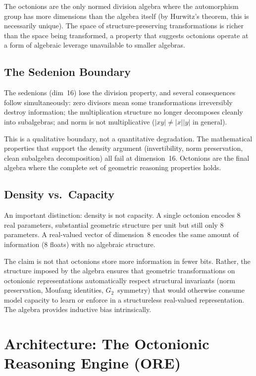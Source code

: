 \documentclass[11pt,a4paper]{article}
\begin{document}
The octonions are the only normed division algebra where the automorphism group has more dimensions than the algebra itself (by Hurwitz's theorem, this is necessarily unique). The space of structure-preserving transformations is richer than the space being transformed, a property that suggests octonions operate at a form of algebraic leverage unavailable to smaller algebras.

\subsection{The Sedenion Boundary}

The sedenions (dim~16) lose the division property, and several consequences follow simultaneously: zero divisors mean some transformations irreversibly destroy information; the multiplication structure no longer decomposes cleanly into subalgebras; and norm is not multiplicative ($\lvert xy \rvert \neq \lvert x \rvert \lvert y \rvert$ in general).

This is a qualitative boundary, not a quantitative degradation. The mathematical properties that support the density argument (invertibility, norm preservation, clean subalgebra decomposition) all fail at dimension~16. Octonions are the final algebra where the complete set of geometric reasoning properties holds.

\subsection{Density vs.\ Capacity}

An important distinction: density is not capacity. A single octonion encodes 8 real parameters, substantial geometric structure per unit but still only 8 parameters. A real-valued vector of dimension~8 encodes the same amount of information (8 floats) with no algebraic structure.

The claim is not that octonions store more information in fewer bits. Rather, the structure imposed by the algebra ensures that geometric transformations on octonionic representations automatically respect structural invariants (norm preservation, Moufang identities, $G_2$~symmetry) that would otherwise consume model capacity to learn or enforce in a structureless real-valued representation. The algebra provides inductive bias intrinsically.

\section{Architecture: The Octonionic Reasoning Engine (ORE)}
\label{sec:architecture}
\end{document}
